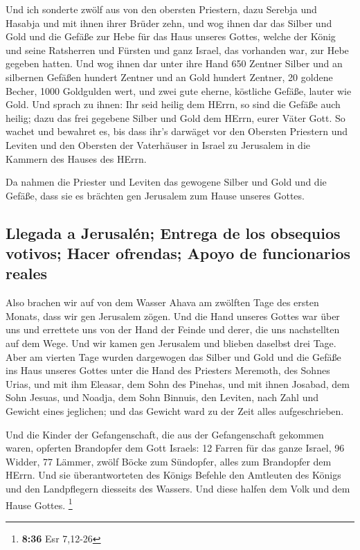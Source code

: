  Und ich sonderte zwölf aus von den obersten Priestern,
dazu Serebja und Hasabja und mit ihnen ihrer Brüder zehn,
 und wog ihnen dar das Silber und Gold und die Gefäße zur
Hebe für das Haus unseres Gottes, welche der König und seine Ratsherren
und Fürsten und ganz Israel, das vorhanden war, zur Hebe gegeben hatten.
 Und wog ihnen dar unter ihre Hand 650 Zentner Silber und
an silbernen Gefäßen hundert Zentner und an Gold hundert Zentner,
 20 goldene Becher, 1000 Goldgulden wert, und zwei gute
eherne, köstliche Gefäße, lauter wie Gold.  Und sprach zu
ihnen: Ihr seid heilig dem HErrn, so sind die Gefäße auch heilig; dazu
das frei gegebene Silber und Gold dem HErrn, eurer Väter Gott.
 So wachet und bewahret es, bis dass ihr's darwäget vor
den Obersten Priestern und Leviten und den Obersten der Vaterhäuser in
Israel zu Jerusalem in die Kammern des Hauses des HErrn.

 Da nahmen die Priester und Leviten das gewogene Silber
und Gold und die Gefäße, dass sie es brächten gen Jerusalem zum Hause
unseres Gottes.

\hypertarget{llegada-a-jerusaluxe9n-entrega-de-los-obsequios-votivos-hacer-ofrendas-apoyo-de-funcionarios-reales}{%
\subsection{Llegada a Jerusalén; Entrega de los obsequios votivos; Hacer
ofrendas; Apoyo de funcionarios
reales}\label{llegada-a-jerusaluxe9n-entrega-de-los-obsequios-votivos-hacer-ofrendas-apoyo-de-funcionarios-reales}}

 Also brachen wir auf von dem Wasser Ahava am zwölften
Tage des ersten Monats, dass wir gen Jerusalem zögen. Und die Hand
unseres Gottes war über uns und errettete uns von der Hand der Feinde
und derer, die uns nachstellten auf dem Wege.  Und wir
kamen gen Jerusalem und blieben daselbst drei Tage.  Aber
am vierten Tage wurden dargewogen das Silber und Gold und die Gefäße ins
Haus unseres Gottes unter die Hand des Priesters Meremoth, des Sohnes
Urias, und mit ihm Eleasar, dem Sohn des Pinehas, und mit ihnen Josabad,
dem Sohn Jesuas, und Noadja, dem Sohn Binnuis, den Leviten,
 nach Zahl und Gewicht eines jeglichen; und das Gewicht
ward zu der Zeit alles aufgeschrieben.

 Und die Kinder der Gefangenschaft, die aus der
Gefangenschaft gekommen waren, opferten Brandopfer dem Gott Israels: 12
Farren für das ganze Israel, 96 Widder, 77 Lämmer, zwölf Böcke zum
Sündopfer, alles zum Brandopfer dem HErrn.  Und sie
überantworteten des Königs Befehle den Amtleuten des Königs und den
Landpflegern diesseits des Wassers. Und diese halfen dem Volk und dem
Hause Gottes. \footnote{\textbf{8:36} Esr 7,12-26}

